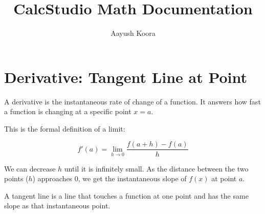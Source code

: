 \documentclass{article}
\title{CalcStudio Math Documentation}
\author{Aayush Koora}
\begin{document}
\maketitle

\newpage
\section{Derivative: Tangent Line at Point}

\noindent
A derivative is the instantaneous rate of change of a function. It answers how fast a function is changing at a specific point \( x = a \).

\vspace{1em}

This is the formal definition of a limit:

\vspace{1em}

\begin{equation}
f'(a) = \lim_{h \to 0} \frac{f(a + h) - f(a)}{h}
\end{equation}

\vspace{1.5em}

\begin{center}
\end{center}

\vspace{1.5em}

\noindent
We can decrease \( h \) until it is infinitely small. As the distance between the two points (\( h \)) approaches 0, we get the instantaneous slope of \( f(x) \) at point \( a \).

\vspace{1em}

\noindent
A tangent line is a line that touches a function at one point and has the same slope as that instantaneous point.

\vspace{1em}
\end{document}
